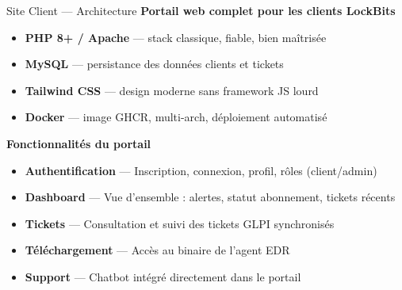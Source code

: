 \documentclass[xcolor=dvipsnames, aspectratio=169, 10pt]{beamer}
\newcommand{\bitem}{\item[$\bullet$]}
\begin{document}
\begin{frame}{Site Client — Architecture}
  \textbf{Portail web complet pour les clients LockBits}
  \begin{itemize}
    \bitem \textbf{PHP 8+ / Apache} — stack classique, fiable, bien maîtrisée
    \bitem \textbf{MySQL} — persistance des données clients et tickets
    \bitem \textbf{Tailwind CSS} — design moderne sans framework JS lourd
    \bitem \textbf{Docker} — image GHCR, multi-arch, déploiement automatisé
  \end{itemize}
  \vspace{0.3cm}
  \textbf{Fonctionnalités du portail}
  \begin{itemize}
    \bitem \textbf{Authentification} — Inscription, connexion, profil, rôles (client/admin)
    \bitem \textbf{Dashboard} — Vue d'ensemble : alertes, statut abonnement, tickets récents
    \bitem \textbf{Tickets} — Consultation et suivi des tickets GLPI synchronisés
    \bitem \textbf{Téléchargement} — Accès au binaire de l'agent EDR
    \bitem \textbf{Support} — Chatbot intégré directement dans le portail
  \end{itemize}
\end{frame}
\end{document}
